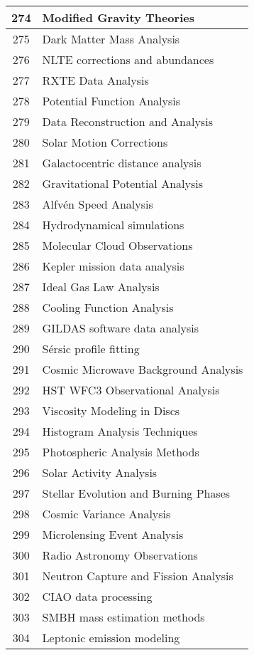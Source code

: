 \begin{table}[htbp]
\begin{tabular}{|c|l|}
\hline
274 & Modified Gravity Theories \\
\hline
275 & Dark Matter Mass Analysis \\
\hline
276 & NLTE corrections and abundances \\
\hline
277 & RXTE Data Analysis \\
\hline
278 & Potential Function Analysis \\
\hline
279 & Data Reconstruction and Analysis \\
\hline
280 & Solar Motion Corrections \\
\hline
281 & Galactocentric distance analysis \\
\hline
282 & Gravitational Potential Analysis \\
\hline
283 & Alfvén Speed Analysis \\
\hline
284 & Hydrodynamical simulations \\
\hline
285 & Molecular Cloud Observations \\
\hline
286 & Kepler mission data analysis \\
\hline
287 & Ideal Gas Law Analysis \\
\hline
288 & Cooling Function Analysis \\
\hline
289 & GILDAS software data analysis \\
\hline
290 & Sérsic profile fitting \\
\hline
291 & Cosmic Microwave Background Analysis \\
\hline
292 & HST WFC3 Observational Analysis \\
\hline
293 & Viscosity Modeling in Discs \\
\hline
294 & Histogram Analysis Techniques \\
\hline
295 & Photospheric Analysis Methods \\
\hline
296 & Solar Activity Analysis \\
\hline
297 & Stellar Evolution and Burning Phases \\
\hline
298 & Cosmic Variance Analysis \\
\hline
299 & Microlensing Event Analysis \\
\hline
300 & Radio Astronomy Observations \\
\hline
301 & Neutron Capture and Fission Analysis \\
\hline
302 & CIAO data processing \\
\hline
303 & SMBH mass estimation methods \\
\hline
304 & Leptonic emission modeling \\

\end{tabular}
\end{table}
